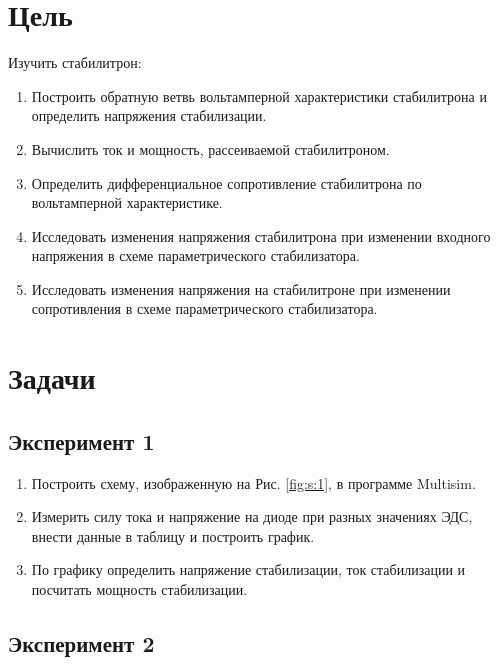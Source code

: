\documentclass[12pt]{article}
\begin{document}
    \newpage

    \pagestyle{plain}
    \setcounter{page}{1}

    \section*{Цель}

    Изучить стабилитрон:

    \begin{enumerate}
        \item Построить обратную ветвь вольтамперной характеристики стабилитрона и определить напряжения стабилизации.
        \item Вычислить ток и мощность, рассеиваемой стабилитроном.
        \item Определить дифференциальное сопротивление стабилитрона по вольтамперной характеристике.
        \item Исследовать изменения напряжения стабилитрона при изменении входного напряжения в схеме параметрического стабилизатора.
        \item Исследовать изменения напряжения на стабилитроне при изменении сопротивления в схеме параметрического стабилизатора.
    \end{enumerate}

    \section*{Задачи}

    \subsection*{Эксперимент 1}

    \begin{enumerate}
        \item Построить схему, изображенную на Рис. \ref{fig:s:1}, в программе Multisim.
        \item Измерить силу тока и напряжение на диоде при разных значениях ЭДС, внести данные в таблицу и построить график.
        \item По графику определить напряжение стабилизации, ток стабилизации и посчитать мощность стабилизации.
    \end{enumerate}

    \subsection*{Эксперимент 2}
\end{document}
